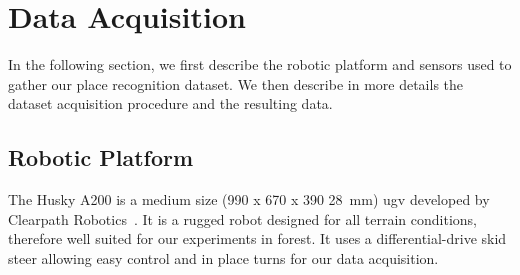 \section{Data Acquisition}
\label{sec:chap_slam_data_acquisition}

In the following section, we first describe the robotic platform and sensors used to gather our place recognition dataset. We then describe in more details the dataset acquisition procedure and the resulting data.

\subsection{Robotic Platform}
The Husky A200 is a medium size (990 x 670 x 390 \SI{28}{\milli\meter}) \gls{ugv} developed by Clearpath Robotics~\cite{ClearpathWeb}. It is a rugged robot designed for all terrain conditions, therefore well suited for our experiments in forest. It uses a differential-drive skid steer allowing easy control and in place turns for our data acquisition.

